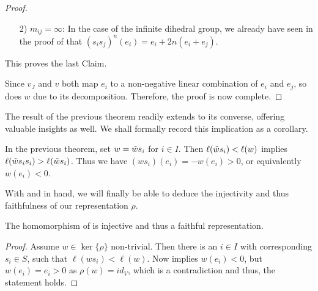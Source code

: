 \begin{proof}
{\begin{itemize}
                  Thus, any element is of length \(< m_{ij}\) and has a unique word corresponding to the edge labels in the Cayley graph.
                  Note that the maximum length of \(w\in W_J\) is precisely \(m_{ij}\) (as the Cayley graph is a cycle of length \(2m_{ij}\)).
                  The element of length \(m_{ij}\) is represented by the reduced expressions \(s_is_j\cdots s_j\) and \(s_js_i\cdots s_i\).
                  This implies that \(v_J\) has to have length smaller \(m_{ij}\), else it would have a reduced expression ending in \(s_i\), contradicting the above.
                  Then \(v_J\) is a product of less than \(\frac{m_{ij}}{2}\) terms \(s_is_j\), and each of the products \(s_is_j\) is a counterclockwise rotation about \(\frac{2\pi}{m_{ij}}\).
                  So \(v_J\) rotates \(e_i\) at maximum \(\pi - \frac{2\pi}{m_{ij}}\), which still lies inside the cone spanned by \(e_i\) and \(e_j\).
                  In particular the resulting vector is a non-negative linear combination. %

            \item[2)] \(m_{ij} = \infty\): In the case of the infinite dihedral group, we already have seen in the proof of  that \((s_is_j)^n(e_i) = e_i + 2n(e_i + e_j)\).
        \end{itemize}
        This proves the last Claim.
    }
    Since \(v_J\) and \(v\) both map \(e_i\) to a non-negative linear combination of \(e_i\) and \(e_j\), so does \(w\) due to its decomposition.
    Therefore, the proof is now complete.
\end{proof}

The result of the previous theorem readily extends to its converse, offering valuable insights as well.
We shall formally record this implication as a corollary.

\begin{corollary}\label{cor:lengthsmall}
    In the previous theorem, set \(w = \Tilde{w}s_i\) for \(i\in I\).
    Then \(\ell(\Tilde{w}s_i) < \ell(w)\) implies \(\ell(\Tilde{w}s_is_i) > \ell(\Tilde{w}s_i)\).
    Thus we have \((ws_i)(e_i) = -w(e_i) > 0\), or equivalently \(w(e_i) < 0\).
\end{corollary}

With  and  in hand, we will finally be able to deduce the injectivity and thus faithfulness of our representation \(\rho\).

\begin{corollary}\label{cor:faithful}
    The homomorphism of  is injective and thus a faithful representation.
\end{corollary}
\begin{proof}
    Assume \(w\in\ker\{\rho\}\) non-trivial. %
    Then there is an \(i\in I\) with corresponding \(s_i\in S\), such that \(\ell(ws_i) < \ell(w)\).
    Now  implies \(w(e_i) < 0\), but \(w(e_i) = e_i > 0\) as \(\rho(w) = id_V\), which is a contradiction and thus, the statement holds.
\end{proof}


